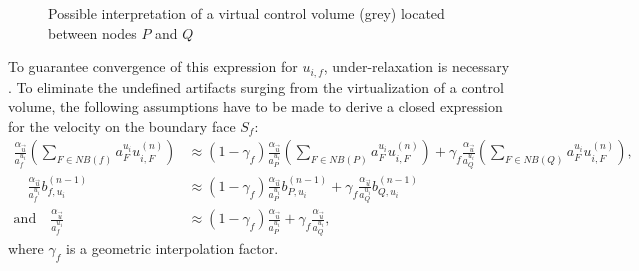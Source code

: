 \begin{figure}[h]
  
  \centering{}
  \caption{Possible interpretation of a virtual control volume (grey) located between nodes $P$ and $Q$ }
  \label{fig:virt}
\end{figure}

To guarantee convergence of this expression for \(u_{i,f}\), under-relaxation is necessary \cite{majumdar88}. To eliminate the undefined artifacts surging from the virtualization of a control volume, the following assumptions have to be made to derive a closed expression for the velocity on the boundary face \(S_f\):
\begin{subequations}
\label{eq:approxpwim}
\begin{align}
  \frac{\alpha_{\vec{u}}}{a_f^{u_i}} \left(\sum_{F \in NB(f)} a_F^{u_i} u_{i,F}^{(n)} \right)
  &\approx
  \left(1-\gamma_f\right) \frac{\alpha_{\vec{u}}}{a_P^{u_i}} \left(\sum_{F \in NB(P)} a_F^{u_i} u_{i,F}^{(n)} \right)
  +
  \gamma_f \frac{\alpha_{\vec{u}}}{a_Q^{u_i}} \left(\sum_{F \in NB(Q)} a_F^{u_i} u_{i,F}^{(n)} \right), \\[1em]
  \quad
  \frac{\alpha_{\vec{u}}}{a_f^{u_i}}b_{f,u_i}^{(n-1)} 
  &\approx
  \left(1-\gamma_f\right) \frac{\alpha_{\vec{u}}}{a_P^{u_i}} b_{P,u_i}^{(n-1)} 
  +
  \gamma_f \frac{\alpha_{\vec{u}}}{a_Q^{u_i}} b_{Q,u_i}^{(n-1)} \\[1em]
  \text{and}
  \quad
  \frac{\alpha_{\vec{u}}}{a_f^{u_i}} 
  &\approx
  \left(1-\gamma_f\right) \frac{\alpha_{\vec{u}}}{a_P^{u_i}} 
  +
  \gamma_f \frac{\alpha_{\vec{u}}}{a_Q^{u_i}},
\end{align}
\end{subequations}
where \(\gamma_f\) is a geometric interpolation factor. 

